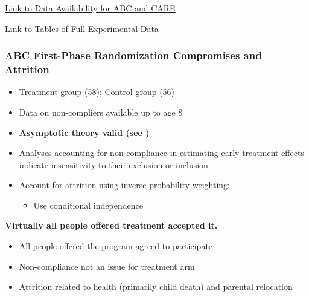 \documentclass[static]{JJH-Beamer}
\begin{document}
\begin{frame}

\hypertarget{ret:protein}{}
\begin{center}
\hyperlink{protein}{\underline{Link to Data Availability for ABC and CARE}}
\end{center}

\end{frame}

\begin{frame}

\hypertarget{ret:potatochips}{}
\begin{center}
\hyperlink{potatochips}{\underline{Link to Tables of Full Experimental Data}}
\end{center}

\end{frame}

\begin{frame}
\frametitle{\textbf{ABC First-Phase Randomization Compromises and Attrition}}

\begin{itemize}
\item Treatment group (58); Control group (56)
\item Data on non-compliers available up to age 8
\item \textbf{Asymptotic theory valid (see \citealp{Campbell_Conti_etal_2014_EarlyChildhoodInvestments})}
\item Analyses accounting for non-compliance in estimating early treatment effects indicate insensitivity to their exclusion or inclusion
\item Account for attrition using inverse probability weighting:
    \begin{itemize}
    \item Use conditional independence \citep{Horvitz_Thompson_1952_JASA}
    \end{itemize}
\end{itemize}

\end{frame}

\begin{frame}

\begin{center}
\textbf{Virtually all people offered treatment accepted it.}
\end{center}

\begin{itemize}
\item All people offered the program agreed to participate
\item Non-compliance not an issue for treatment arm
\item Attrition related to health (primarily child death) and parental relocation
\end{itemize}

\end{frame}
\end{document}
